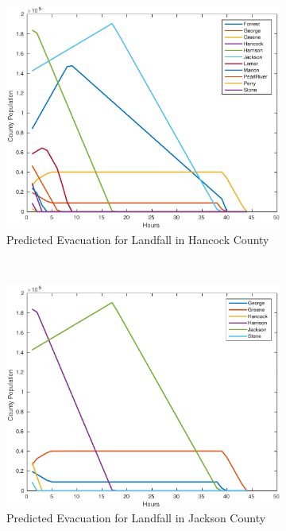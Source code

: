 \documentclass[titlepage]{article}
\begin{document}
    \begin{figure}
      \center
      \begin{subfigure}[b]{0.5\textwidth}
        \center
        \includegraphics[width=\linewidth]{figures/pred_hancock-crop.pdf}
        \caption{Predicted Evacuation for Landfall in Hancock County}
        \label{fig:stochastic_out_large}
      \end{subfigure}~
      \begin{subfigure}[b]{0.5\textwidth}
        \center
        \includegraphics[width=\linewidth]{figures/pred_jackson-crop.pdf}
        \caption{Predicted Evacuation for Landfall in Jackson County}
        \label{fig:stochastic_out_small}
      \end{subfigure}
      \caption{}
      \label{fig:stochastic_out}
    \end{figure}
\end{document}
